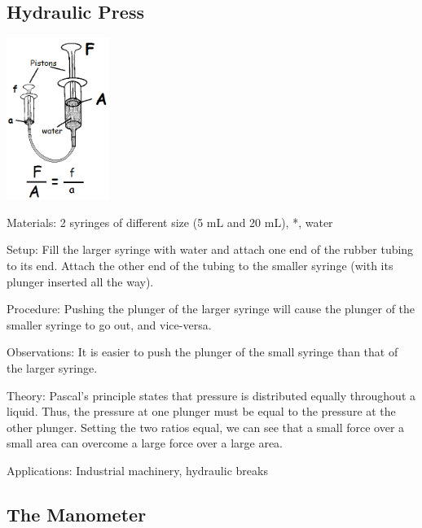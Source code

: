 \begin{multicols}{2}
\subsection{Hydraulic Press}

\begin{center}
\includegraphics[width=0.25\textwidth]{./img/source/hydraulic-press.png}
\end{center}

\begin{description*}
\item[Materials:]{2 syringes of different size (5 mL and 20 mL), *, water}
\item[Setup:]{Fill the larger syringe with water and attach one end of the rubber tubing to its end. Attach the other end of the tubing to the smaller syringe (with its plunger inserted all the way).}
\item[Procedure:]{Pushing the plunger of the larger syringe will cause the plunger of the smaller syringe to go out, and vice-versa.}
\item[Observations:]{It is easier to push the plunger of the small syringe than that of the larger syringe.}
\item[Theory:]{Pascal's principle states that pressure is distributed equally throughout a liquid. Thus, the pressure at one plunger must be equal to the pressure at the other plunger. Setting the two ratios equal, we can see that a small force over a small area can overcome a large force over a large area.}
\item[Applications:]{Industrial machinery, hydraulic breaks}
\end{description*}

\subsection{The Manometer}


\end{multicols}
